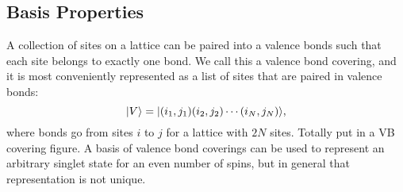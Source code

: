 \subsection{Basis Properties}
A collection of sites on a lattice can be paired into a valence bonds such that each site
belongs to exactly one bond.  
We call this a valence bond covering, and it is most conveniently represented as a list of 
sites that are paired in valence bonds:
\begin{equation}
	\lvert {V} \rangle = \lvert {(i_1,j_1)(i_2,j_2)\cdots(i_N,j_N)} \rangle,
\end{equation}
where bonds go from sites $i$ to $j$ for a lattice with $2N$ sites.  
{\color{red} Totally put in a VB covering figure.}
A basis of valence bond coverings can be used to represent an arbitrary singlet state
for an even number of spins, but in general that representation is not unique.

